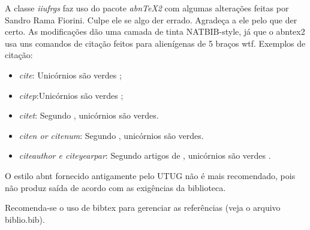 \documentclass[pgmicro,tese]{iiufrgs}
\begin{document}
A classe \emph{iiufrgs} faz uso do pacote \emph{abnTeX2} com algumas alterações
feitas por Sandro Rama Fiorini. Culpe ele se algo der errado. Agradeça a ele
pelo que der certo. As modificações dão uma camada de tinta NATBIB-style,
já que o abntex2 usa uns comandos de citação feitos para alienígenas de 5 braços 
wtf. Exemplos de citação:

\begin{itemize}
    \item \emph{cite}: Unicórnios são verdes \cite{Adams2009Conceptual};
    \item \emph{citep}:Unicórnios são verdes \citep{Adams2009Conceptual};
    \item \emph{citet}: Segundo \citet{Adams2009Conceptual}, unicórnios são
                        verdes.
    \item \emph{citen or citenum}: Segundo ,
        unicórnios são verdes.
    \item \emph{citeauthor e citeyearpar}: Segundo artigos de
        \citeauthor{Adams2009Conceptual} , unicórnios são verdes 
        \citeyearpar{Adams2009Conceptual}.

\end{itemize}

O estilo abnt fornecido antigamente pelo UTUG não é mais recomendado, pois não
produz saída de acordo com as exigências da biblioteca.

Recomenda-se o uso de bibtex para gerenciar as referências (veja o arquivo
biblio.bib).

%

%



\end{document}

